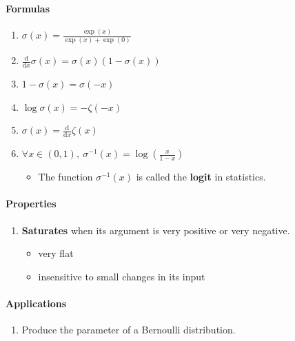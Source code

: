\documentclass[12pt, a4paper]{article}
\newcommand{\dx}[1]{\frac{\mathrm{d}}{\mathrm{d}x} #1}
\begin{document}
\paragraph{Formulas}
\begin{enumerate}
    \item $\displaystyle \sigma(x) = \frac{\exp(x)}{\exp(x) + \exp(0)}$
    \item $\displaystyle \dx{\sigma(x)} = \sigma(x) (1 - \sigma(x))$
    \item $\displaystyle 1 - \sigma(x) = \sigma(-x)$
    \item $\displaystyle \log \sigma(x) = - \zeta(-x)$
    \item $\displaystyle \sigma(x) = \dx{\zeta(x)}$
    \item $\displaystyle \forall x\in(0,1),\ \sigma^{-1}(x) = \log \left( \frac{x}{1-x} \right)$
        \begin{itemize}
            \item The function $\sigma^{-1}(x)$ is called the \textbf{logit} in statistics.
        \end{itemize}
\end{enumerate}
\paragraph{Properties}
\begin{enumerate}
    \item \textbf{Saturates} when its argument is very positive or very negative.
        \begin{itemize}
            \item very flat
            \item insensitive to small changes in its input
        \end{itemize}
\end{enumerate}
\paragraph{Applications}
\begin{enumerate}
    \item Produce the parameter of a Bernoulli distribution.
\end{enumerate}
\end{document}
